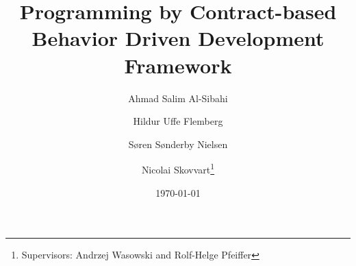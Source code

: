 \documentclass{llncs}
\begin{document}
\title{Programming by Contract-based Behavior Driven Development Framework}
\author{Ahmad Salim Al-Sibahi \and Hildur Uffe Flemberg \and S\o ren S\o nderby Nielsen \and Nicolai Skovvart\thanks{Supervisors: Andrzej Wasowski and Rolf-Helge Pfeiffer}}
\date{\today}

\maketitle



\tableofcontents





















\end{document}
